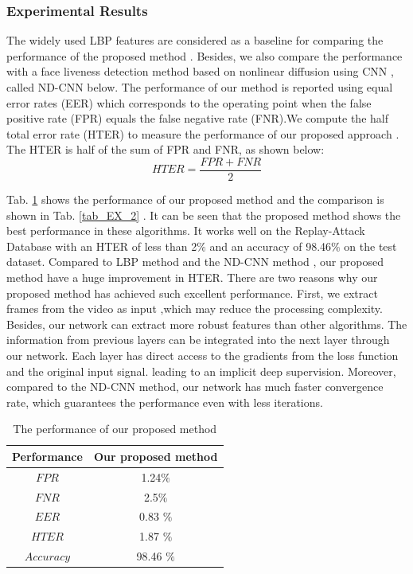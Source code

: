 \documentclass[journal]{IEEEtran}
\begin{document}
\subsubsection*{\textbf{Experimental Results}}
The widely used LBP features are considered as a baseline for comparing the performance of the proposed method \cite{chingovska2012effectiveness}. Besides, we also compare the performance with a face liveness detection method based on nonlinear diffusion using CNN \cite{alotaibi2017deep},  called ND-CNN below.  The performance of our method
is reported using equal error rates (EER) which corresponds to the operating point when the false positive rate (FPR) equals the false negative rate (FNR).We compute the half total error rate (HTER) to measure the performance of our proposed approach \cite{bengio2004statistical}. The HTER is half of the sum of FPR and FNR, as shown below:
\begin{equation}
\label{eq_Ex_1}
HTER = \frac{FPR+FNR}{2}
\end{equation}

 Tab. \ref{tab_EX_1} shows the performance of our proposed method and the comparison is shown in Tab. \ref{tab_EX_2} . It can be seen that the proposed method shows the best performance in these algorithms. It works well on the Replay-Attack Database with an HTER of less than 2$\%$ and an accuracy of 98.46$\%$ on the test dataset. Compared to LBP method and the ND-CNN method ,  our proposed method have a huge improvement in HTER. There are two reasons why our proposed method has achieved such excellent performance. First, we extract frames from the video as input ,which may reduce the processing complexity. Besides, our network can extract more robust features than other algorithms.  The information from previous layers can be integrated into the next layer through our network. Each layer has direct access to the gradients from the loss function and the original input signal. leading to an implicit deep supervision. Moreover, compared to the ND-CNN method, our network has much faster convergence rate, which guarantees the performance even with less iterations.
 
 \begin{table}[ht]
 	\renewcommand{\arraystretch}{1.3}
 	\normalsize
 	\centering
 	\caption{ The performance of our proposed method}
 	\label{tab_EX_1}
 	\begin{tabular}{|c|c|}
 		\hline
 		 Performance & Our proposed method\\
 		\hline \hline
 		$FPR$ & 1.24$\%$ \\
 		\hline
 		$FNR$ & 2.5$\%$ \\
 		\hline 
 		$EER$ & 0.83 $\%$  \\
 		\hline
 		$HTER$ & 1.87 $\%$ \\
 		\hline
 		$Accuracy$  & 98.46 $\%$ \\
 		\hline
 	\end{tabular}
 \end{table}
 
\end{document}
